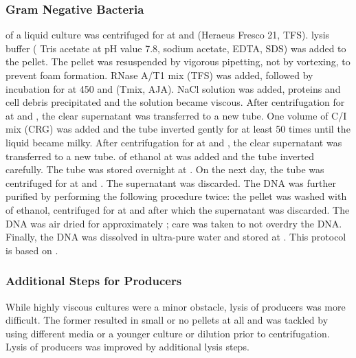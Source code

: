 \subsubsection{Gram Negative Bacteria}
 of a liquid culture was centrifuged for  at  and  (Heraeus Fresco 21, TFS).  lysis buffer ( Tris acetate at pH value \num{7.8},  sodium acetate,  EDTA,  SDS) was added to the pellet. The pellet was resuspended by vigorous pipetting, not by vortexing, to prevent foam formation.  RNase A/T1 mix (TFS) was added, followed by incubation for  at \SI{450}{\rpm} and  (Tmix, AJA).   NaCl solution was added, proteins and cell debris precipitated and the solution became viscous. After centrifugation for  at  and , the clear supernatant was transferred to a new tube. One volume of C/I mix (CRG) was added and the tube inverted gently for at least \num{50} times until the liquid became milky. After centrifugation for  at  and , the clear supernatant was transferred to a new tube.  of  ethanol at  was added and the tube inverted carefully. The tube was stored overnight at . On the next day, the tube was centrifuged for  at  and . The supernatant was discarded. The DNA was further purified by performing the following procedure twice: the pellet was washed with  of  ethanol, centrifuged for  at  and  after which the supernatant was discarded. The DNA was air dried for approximately ; care was taken to not overdry the DNA. Finally, the DNA was dissolved in  ultra-pure water and stored at . This protocol is based on \cite{Chen1993}.

\subsubsection{Additional Steps for \EPS{} Producers}
While highly viscous cultures were a minor obstacle, lysis of \eps{} producers was more difficult. The former resulted in small or no pellets at all and was tackled by using different media or a younger culture or dilution prior to centrifugation. Lysis of \eps{} producers was improved by additional lysis steps.

